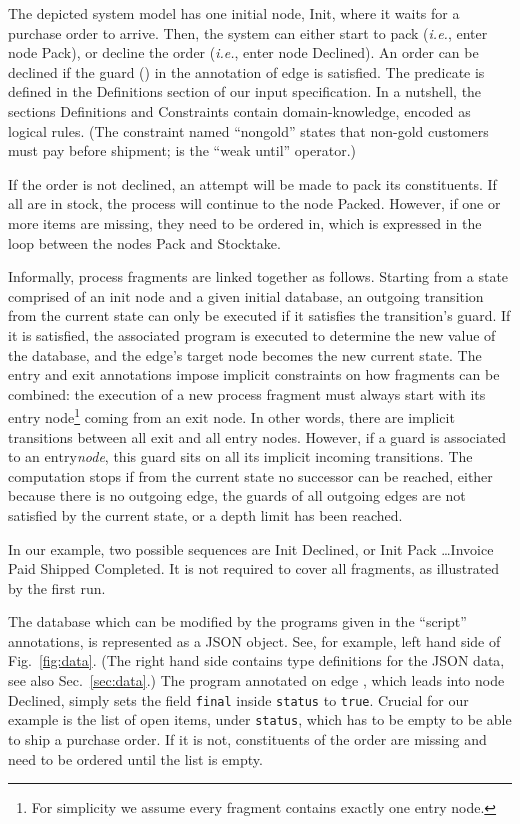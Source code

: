 \documentclass{llncs}
\newcommand{\ie}{\textit{i.e.}}
\newcommand{\secref}[1]{Sec.~\ref{#1}}
\newcommand{\entry}{\ensuremath{\mathrm{entry}}\xspace}
\newcommand{\exit}{\ensuremath{\mathrm{exit}}\xspace}
\newcommand{\init}{\ensuremath{\mathrm{init}}\xspace}
\begin{document}
The depicted system model has one initial node, Init, where it
waits for a purchase order to arrive.
Then, the system can either start to pack (\ie, enter node Pack), or decline the order (\ie, enter node
Declined).
An order can be declined if the guard () in the annotation of edge  is satisfied.
The predicate  is defined in the
Definitions section of our input specification.
In a nutshell, the sections Definitions and Constraints contain domain-knowledge, encoded as logical rules.
(The constraint named ``nongold'' states that non-gold customers
must pay before shipment;  is the ``weak until'' operator.)

If the order is not declined, an attempt will be made to pack its constituents.
If all are in stock, the process will continue to the node Packed.
However, if one or more items are missing, they need to be ordered in, which is expressed in the loop between the nodes Pack and Stocktake.

Informally, process fragments are linked together as follows.
Starting from a state comprised of an \init node and a given initial database, an outgoing transition from the current state can only be executed
if it satisfies the transition's guard.
If it is satisfied, the associated program is executed to determine the new value of the database, and the edge's target node becomes the new current state.
The \entry and \exit annotations impose implicit constraints on how
fragments can be combined: the execution of a new process fragment must
always start with its \entry node\footnote{For simplicity we assume
  every fragment contains exactly one entry node.} coming from an \exit node. In
other words, there are implicit transitions between all \exit and all \entry nodes. 
However, if a guard is associated to an
\entry \emph{node}, this guard sits on all its implicit incoming transitions. 
The computation stops if from the current
state no successor can be reached, either because there is no outgoing
edge, the guards of all outgoing edges are not satisfied by the
current state, or a depth limit has been reached.

In our example, two possible sequences are Init  Declined, or
Init  Pack  \ldots  Invoice
 Paid  Shipped Completed.
It is not required to cover all fragments, as illustrated by the first run.

The database which can be modified by the programs given in the
``script'' annotations, is represented as a JSON object.  See, for
example, left hand side of Fig.~\ref{fig:data}.  (The right hand side
contains type definitions for the JSON data, see also
\secref{sec:data}.)  The program annotated on
edge , which leads into node Declined, simply sets the field
\texttt{final} inside \texttt{status} to \texttt{true}.
Crucial for our example is the list of open items, under
\texttt{status}, which has to be empty to be able to ship a purchase
order.  If it is not, constituents of the order are missing and need to
be ordered until the list is empty.
\end{document}
